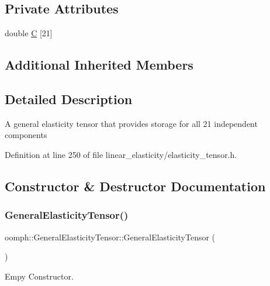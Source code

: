 \subsection*{Private Attributes}
\begin{DoxyCompactItemize}
\item 
double \hyperlink{classoomph_1_1GeneralElasticityTensor_afc3c4afaaa1eef1c57913e1e20c0d483}{C} \mbox{[}21\mbox{]}
\end{DoxyCompactItemize}
\subsection*{Additional Inherited Members}


\subsection{Detailed Description}
A general elasticity tensor that provides storage for all 21 independent components 

Definition at line 250 of file linear\+\_\+elasticity/elasticity\+\_\+tensor.\+h.



\subsection{Constructor \& Destructor Documentation}
\mbox{\label{classoomph_1_1GeneralElasticityTensor_a6b22a3888a575e622693268bc80ab504}} 
\subsubsection{\texorpdfstring{General\+Elasticity\+Tensor()}{GeneralElasticityTensor()}}
{\footnotesize\ttfamily oomph\+::\+General\+Elasticity\+Tensor\+::\+General\+Elasticity\+Tensor (\begin{DoxyParamCaption}{ }\end{DoxyParamCaption})\hspace{0.3cm}{\ttfamily [inline]}}



Empy Constructor. 



